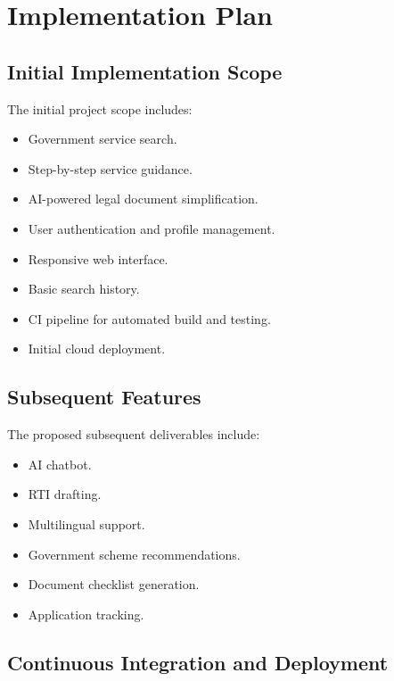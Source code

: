 \documentclass[12pt,a4paper]{report}
\begin{document}
\chapter{Implementation Plan}

\section{Initial Implementation Scope}

The initial project scope includes:

\begin{itemize}[leftmargin=*]
    \item Government service search.
    \item Step-by-step service guidance.
    \item AI-powered legal document simplification.
    \item User authentication and profile management.
    \item Responsive web interface.
    \item Basic search history.
    \item CI pipeline for automated build and testing.
    \item Initial cloud deployment.
\end{itemize}

\section{Subsequent Features}

The proposed subsequent deliverables include:

\begin{itemize}[leftmargin=*]
    \item AI chatbot.
    \item RTI drafting.
    \item Multilingual support.
    \item Government scheme recommendations.
    \item Document checklist generation.
    \item Application tracking.
\end{itemize}

\section{Continuous Integration and Deployment}
\end{document}
